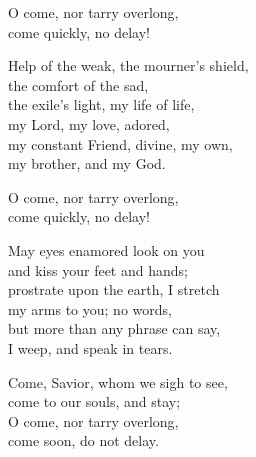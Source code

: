 \begin{lyrics}
O come, nor tarry overlong,\\
come quickly, no delay!

Help of the weak, the mourner’s shield,\\
the comfort of the sad,\\
the exile’s light, my life of life,\\
my Lord, my love, adored,\\
my constant Friend, divine, my own,\\
my brother, and my God.

O come, nor tarry overlong,\\
come quickly, no delay!

May eyes enamored look on you\\
and kiss your feet and hands;\\
prostrate upon the earth, I stretch\\
my arms to you; no words,\\
but more than any phrase can say,\\
I weep, and speak in tears.

Come, Savior, whom we sigh to see,\\
come to our souls, and stay;\\
O come, nor tarry overlong,\\
come soon, do not delay.
\end{lyrics}

